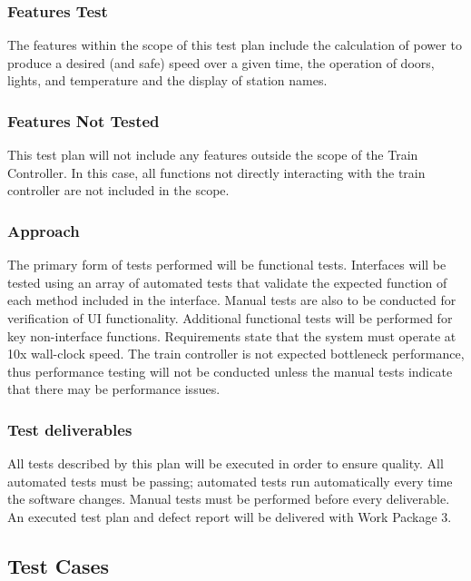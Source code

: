 \documentclass{scrreprt}
\begin{document}
\subsubsection{Features Test}
The features within the scope of this test plan include the calculation of power to produce a desired (and safe) speed over a given time, the operation of doors, lights, and temperature and the display of station names.

\subsubsection{Features Not Tested}
This test plan will not include any features outside the scope of the Train Controller. In this case, all functions not directly interacting with the train controller are not included in the scope.

\subsubsection{Approach}
The primary form of tests performed will be functional tests. Interfaces will be tested using an array of automated tests that validate the expected function of each method included in the interface. Manual tests are also to be conducted for verification of UI functionality.  Additional functional tests will be performed for key non-interface functions. Requirements state that the system must operate at 10x wall-clock speed. The train controller is not expected bottleneck performance, thus performance testing will not be conducted unless the manual tests indicate that there may be performance issues.

\subsubsection{Test deliverables}
All tests described by this plan will be executed in order to ensure quality. All automated tests must be passing; automated tests run automatically every time the software changes. Manual tests must be performed before every deliverable. An executed test plan and defect report will be delivered with Work Package 3.

\subsection{Test Cases}
\end{document}
